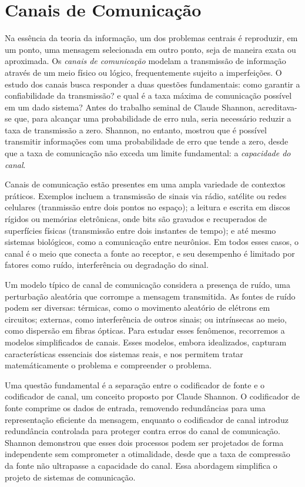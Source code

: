 \chapter{Canais de Comunicação}

Na essência da teoria da informação, um dos problemas centrais é 
reproduzir, em um ponto, uma mensagem selecionada em outro ponto, seja de
maneira exata ou aproximada. Os \emph{canais de comunicação} modelam a transmissão de
informação através de um meio físico ou lógico, frequentemente sujeito a
imperfeições. O estudo dos canais busca responder a duas questões fundamentais: como
garantir a confiabilidade da transmissão? e qual é a taxa máxima de comunicação
possível em um dado sistema? Antes do trabalho seminal de Claude Shannon,
acreditava-se que, para alcançar uma probabilidade de erro nula, seria
necessário reduzir a taxa de transmissão a zero. Shannon, no entanto, mostrou
que é possível transmitir informações com uma probabilidade de erro que tende a
zero, desde que a taxa de comunicação não exceda um limite fundamental: a
\emph{capacidade do canal}.

Canais de comunicação estão presentes em uma ampla variedade de contextos
práticos. Exemplos incluem a transmissão de sinais via rádio, satélite ou redes
celulares (tranmissão entre dois pontos no espaço); a leitura e escrita em
discos rígidos ou memórias eletrônicas, onde bits são gravados e recuperados de
superfícies físicas (transmissão entre dois instantes de tempo); e até mesmo
sistemas biológicos, como a comunicação entre neurônios. Em todos esses casos,
o canal é o meio que conecta a fonte ao receptor, e seu desempenho é limitado
por fatores como ruído, interferência ou degradação do sinal.

Um modelo típico de canal de comunicação considera a presença de ruído, uma
perturbação aleatória que corrompe a mensagem transmitida. As fontes de ruído
podem ser diversas: térmicas, como o movimento aleatório de elétrons em
circuitos; externas, como interferência de outros sinais; ou intrínsecas ao
meio, como dispersão em fibras ópticas. Para estudar esses fenômenos,
recorremos a modelos simplificados de canais. Esses modelos, embora
idealizados, capturam características essenciais dos sistemas reais, e nos
permitem tratar matemáticamente o problema e compreender o problema.

Uma questão fundamental é a separação entre o codificador de fonte e o
codificador de canal, um conceito proposto por Claude Shannon. O codificador de
fonte comprime os dados de entrada, removendo redundâncias para uma
representação eficiente da mensagem, enquanto o codificador de canal introduz
redundância controlada para proteger contra erros do canal de comunicação.
Shannon demonstrou que esses dois processos podem ser projetados de forma
independente sem comprometer a otimalidade, desde que a taxa de compressão da
fonte não ultrapasse a capacidade do canal. Essa abordagem simplifica o projeto
de sistemas de comunicação.


